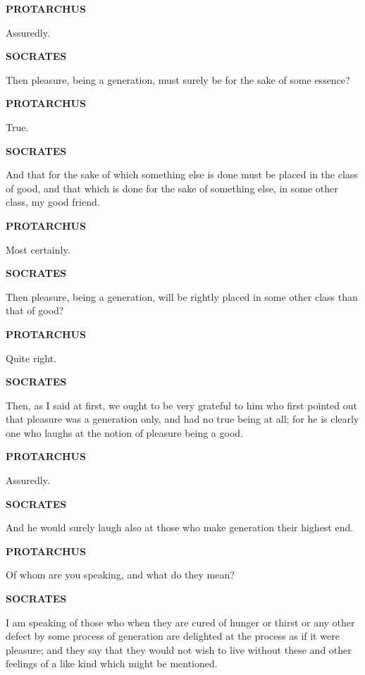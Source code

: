 \documentclass[11pt,letter]{article}
\begin{document}
\par \textbf{PROTARCHUS}
\par   Assuredly.

\par \textbf{SOCRATES}
\par   Then pleasure, being a generation, must surely be for the sake of some essence?

\par \textbf{PROTARCHUS}
\par   True.

\par \textbf{SOCRATES}
\par   And that for the sake of which something else is done must be placed in the class of good, and that which is done for the sake of something else, in some other class, my good friend.

\par \textbf{PROTARCHUS}
\par   Most certainly.

\par \textbf{SOCRATES}
\par   Then pleasure, being a generation, will be rightly placed in some other class than that of good?

\par \textbf{PROTARCHUS}
\par   Quite right.

\par \textbf{SOCRATES}
\par   Then, as I said at first, we ought to be very grateful to him who first pointed out that pleasure was a generation only, and had no true being at all; for he is clearly one who laughs at the notion of pleasure being a good.

\par \textbf{PROTARCHUS}
\par   Assuredly.

\par \textbf{SOCRATES}
\par   And he would surely laugh also at those who make generation their highest end.

\par \textbf{PROTARCHUS}
\par   Of whom are you speaking, and what do they mean?

\par \textbf{SOCRATES}
\par   I am speaking of those who when they are cured of hunger or thirst or any other defect by some process of generation are delighted at the process as if it were pleasure; and they say that they would not wish to live without these and other feelings of a like kind which might be mentioned.
\end{document}
